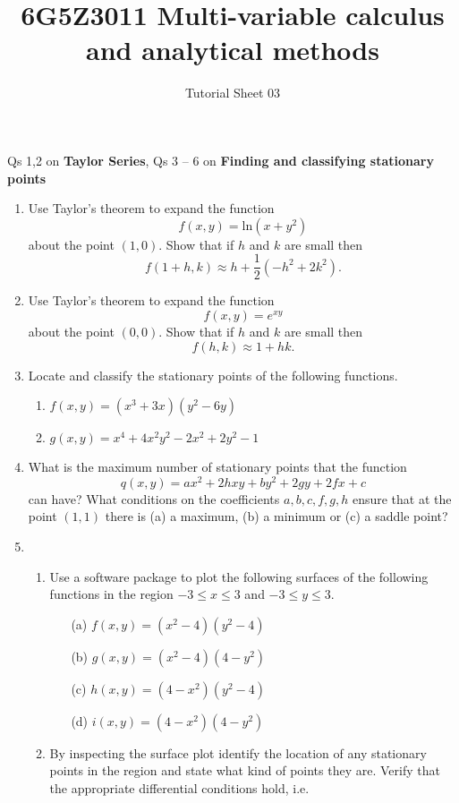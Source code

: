 \documentclass[20pt, a4paper]{extarticle}
\begin{document}
\title{6G5Z3011 Multi-variable calculus and analytical methods}
\author{Tutorial Sheet 03}
\maketitle

Qs 1,2 on \textbf{Taylor Series}, Qs 3 -- 6 on \textbf{Finding and classifying stationary points}
\begin{enumerate}
    \item
    Use Taylor's theorem to expand the function 
    $$f(x,y) = \text{ln}(x+y^2)$$
    about the point $(1,0)$. Show that if $h$ and $k$ are small then
    $$f(1+h,k) \approx h + \frac{1}{2} (-h^2 + 2k^2).$$
    \item
    Use Taylor's theorem to expand the function 
    $$f(x,y) = e^{xy}$$
    about the point $(0,0)$. Show that if $h$ and $k$ are small then
    $$f(h,k) \approx 1+hk.$$
    \item
    Locate and classify the stationary points of the following functions.
    \begin{enumerate}
    \item
    $f(x,y)=(x^3+3x)(y^2-6y)$
    \item
    $g(x,y)=x^4 + 4 x^2 y^2 - 2 x^2 + 2 y^2 - 1$
    \end{enumerate}
    \item
    What is the maximum number of stationary points that the function
    $$q(x,y) = ax^2 + 2hxy + by^2 + 2gy +2fx + c $$
    can have? What conditions on the coefficients $a,b,c,f,g,h$ ensure that at the point $(1,1)$ there is (a) a maximum, (b) a minimum or (c) a saddle point?
    \item
    \begin{enumerate}
    \item
    Use a software package to plot the following surfaces of the following functions in the region $-3 \leq x \leq 3$ and $-3 \leq y \leq 3$.
    \begin{enumerate}
    \item[(a)]
    $f(x,y)=(x^2 - 4)(y^2 - 4)$
    \item[(b)]
    $g(x,y) = (x^2 - 4)(4 - y^2)$
    \item[(c)]
    $h(x,y)=(4-x^2)(y^2-4)$
    \item[(d)]
    $i(x,y) = (4-x^2)(4-y^2)$
    \end{enumerate}
    \item
    By inspecting the surface plot identify the location of any stationary points in the region and state what kind of points they are. Verify that the appropriate differential conditions hold, i.e.

\end{enumerate}
\end{enumerate}
\end{document}
